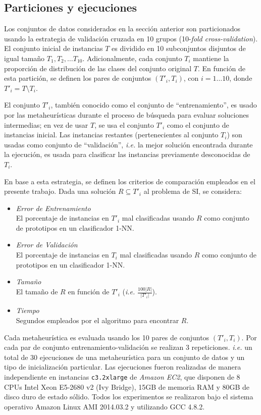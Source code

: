 \subsection{Particiones y ejecuciones}

Los conjuntos de datos considerados en la sección anterior son particionados usando la estrategia de validación cruzada en 10 grupos (10-\emph{fold cross-validation}). El conjunto inicial de instancias $T$ es dividido en 10 subconjuntos disjuntos de igual tamaño $T_1, T_2, \dots T_{10}$. Adicionalmente, cada conjunto $T_i$ mantiene la proporción de distribución de las clases del conjunto original $T$. En función de esta partición, se definen los pares de conjuntos $(T'_i, T_i)$, con $i = 1 \dots 10$, donde $T'_i = T \setminus T_i$.

El conjunto $T'_i$, también conocido como el conjunto de ``entrenamiento'', es usado por las metaheurísticas durante el proceso de búsqueda para evaluar soluciones intermedias; en vez de usar $T$, se usa el conjunto $T'_i$ como el conjunto de instancias inicial. Las instancias restantes (pertenecientes al conjunto $T_i$) son usadas como conjunto de ``validación'', \emph{i.e.} la mejor solución encontrada durante la ejecución, es usada para clasificar las instancias previamente desconocidas de $T_i$.

En base a esta estrategia, se definen los criterios de comparación empleados en el presente trabajo. Dada una solución $R \subseteq T'_i$ al problema de SI, se considera:

\begin{itemize}
\item \emph{Error de Entrenamiento}\\
El porcentaje de instancias en $T'_i$ mal clasificadas usando $R$ como conjunto de prototipos en un clasificador 1-NN.
\item \emph{Error de Validación}\\
El porcentaje de instancias en $T_i$ mal clasificadas usando $R$ como conjunto de prototipos en un clasificador 1-NN.
\item \emph{Tamaño}\\
El tamaño de $R$ en función de $T'_i$ (\emph{i.e.} $\frac{100 \vert R \vert}{\vert T'_i \vert}$).
\item \emph{Tiempo}\\
Segundos empleados por el algoritmo para encontrar $R$.
\end{itemize} 

Cada metaheurística es evaluada usando los 10 pares de conjuntos $(T'_i, T_i)$. Por cada par de conjunto entrenamiento-validación se realizan 3 repeticiones. \emph{i.e.} un total de 30 ejecuciones de una metaheurística para un conjunto de datos y un tipo de inicialización particular. Las ejecuciones fueron realizadas de manera independiente en instancias \texttt{c3.2xlarge} de \emph{Amazon EC2}, que disponen de 8 CPUs Intel Xeon E5-2680 v2 (Ivy Bridge), 15GB de memoria RAM y 80GB de disco duro de estado sólido. Todos los experimentos se realizaron bajo el sistema operativo Amazon Linux AMI 2014.03.2 y utilizando GCC 4.8.2.

